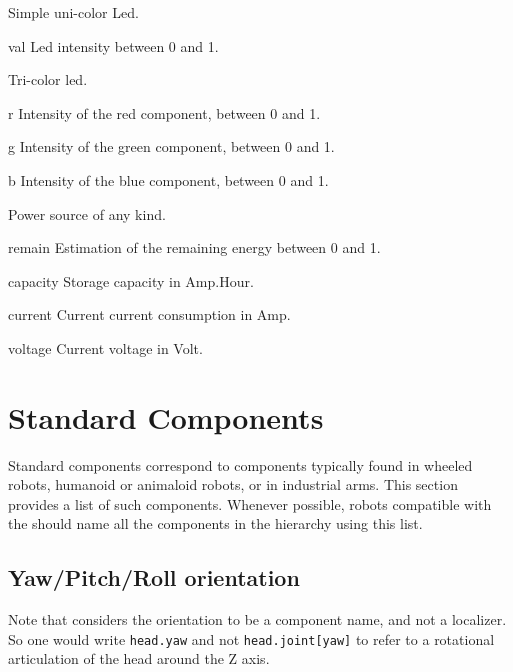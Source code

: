 Simple uni-color Led.

\begin{urbiscriptapi}
\item[val] Led intensity between 0 and 1.
\end{urbiscriptapi}



Tri-color led.

\begin{urbiscriptapi}
\item[r] Intensity of the red component, between 0 and 1.
\item[g] Intensity of the green component, between 0 and 1.
\item[b] Intensity of the blue component, between 0 and 1.
\end{urbiscriptapi}


Power source of any kind.

\begin{urbiscriptapi}
\item[remain] Estimation of the remaining energy between 0 and 1.
\item[capacity] Storage capacity in Amp.Hour.
\item[current] Current current consumption in Amp.
\item[voltage] Current voltage in Volt.
\end{urbiscriptapi}


\section{Standard Components}

Standard components correspond to components typically found in wheeled
robots, humanoid or animaloid robots, or in industrial arms. This section
provides a list of such components. Whenever possible, robots compatible with
the \gsrapi should name all the components in the hierarchy using this list.

\subsection{Yaw/Pitch/Roll orientation}
\label{sec:naming:ypr}

Note that \gsrapi considers the orientation to be a component name, and
not a localizer. So one would write \lstinline|head.yaw| and not
\lstinline|head.joint[yaw]| to refer to a rotational articulation of the head
around the Z axis.

